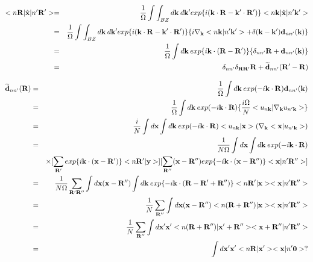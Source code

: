 \documentclass[aps,prb,preprint]{revtex4-1}
\begin{document}
\begin{appendix}
\begin{eqnarray}
 < n{\bf R}| \hat{\bf x} |n'{\bf R'}> = && \frac{1}{\Omega} \int \int_{BZ} d{\bf k} \:d{\bf k'} exp\{i ({\bf k} \cdot {\bf R}- {\bf k'} \cdot {\bf R'} ) \}< n{\bf k}| \hat{\bf x} |n'{\bf k'}>  \nonumber \\
= &&\frac{1}{\Omega}  \int \int_{BZ} d{\bf k} \:d{\bf k'} exp\{i ({\bf k} \cdot {\bf R}- {\bf k'} \cdot {\bf R'} ) \} \{ i \nabla_{\bf k} <n{\bf k}|n'{\bf k'}> + \delta({\bf k-k'}) {\bf d}_{nn'}({\bf k}) \} \nonumber \\
= &&\frac{1}{\Omega} \int d{\bf k} \: exp\{i{\bf k} \cdot ({\bf R- R'} ) \}\{ \delta_{nn'} {\bf R}  + {\bf d}_{nn'}({\bf k}) \} \\
= && \delta_{nn'} \delta_{\bf RR'} {\bf R}  + {\bf \widetilde d}_{nn'}({\bf R'-R})  \\
\end{eqnarray} 

\begin{eqnarray}
 \widetilde{\bf d}_{nn'}({\bf R}) =&& \frac{1}{\Omega} \int d{\bf k} \: exp( -i{\bf k} \cdot {\bf R} ) {\bf d}_{nn'}({\bf k}) \nonumber \\
 =&& \frac{1}{\Omega} \int d{\bf k} \: exp( -i{\bf k} \cdot {\bf R} )\{ \frac{i \Omega}{N} <u_{n{\bf k}}|\nabla_{\bf k} u_{n'{\bf k}}>  \}\nonumber \\
 =&& \frac{i}{N} \int d{\bf x} \int d{\bf k}\: exp( -i{\bf k} \cdot {\bf R}) <u_{n{\bf k}}|{\bf x}> (\nabla_{\bf k}<{\bf x} |u_{n'{\bf k}}> )\nonumber \\
 =&& \frac{1}{N\Omega} \int d{\bf x} \int d{\bf k}\: exp( -i{\bf k} \cdot {\bf R} ) \nonumber \\
&& \times [\sum_{\bf R'} exp\{ i{\bf k} \cdot ({\bf x-R'} )\} <n{\bf R'}|{\bf y}> ] [ \sum_{\bf R''} ({\bf x-R''}) exp\{-i{\bf k} \cdot ({\bf x-R''} )\}< {\bf x} |n'{\bf R''}> ] \nonumber \\
=&& \frac{1}{N\Omega} \sum_{\bf R'R''}  \int d{\bf x} ({\bf x-R''}) \int d{\bf k}\: exp\{ -i{\bf k} \cdot ({\bf R-R'+R''}) \} <n{\bf R'}|{\bf x}> < {\bf x} |n'{\bf R''}>  \nonumber \\
=&& \frac{1}{N} \sum_{\bf R''}  \int d{\bf x} ({\bf x-R''})  <n({\bf R+R''})|{\bf x}> < {\bf x} |n'{\bf R''}>  \nonumber \\
=&& \frac{1}{N} \sum_{\bf R''}  \int d{\bf x'} {\bf x'}  <n({\bf R+R''})|{\bf x'+R''}> < {\bf x+R''} |n'{\bf R''}>  \nonumber \\
=&& \int d{\bf x'} {\bf x'}  <n{\bf R}|{\bf x'}> < {\bf x} |n'{\bf 0}> ? \\
\end{eqnarray}


\end{appendix}
\end{document}
